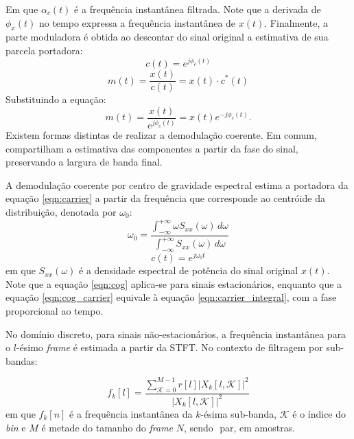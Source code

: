 Em que $\alpha_c(t)$ é a frequência instantânea filtrada. Note que a derivada de
$\phi_x(t)$ no tempo expressa a frequência instantânea de $x(t)$. Finalmente, a
parte moduladora é obtida ao descontar do sinal original a estimativa de sua
parcela portadora:
\begin{equation} \label{eqn:carrier}
    c(t) = e^{j\phi_c(t)}
\end{equation}
\begin{equation}
    m(t) = \frac{x(t)}{c(t)} = x(t) \cdot  c^*(t)
\end{equation}
Substituindo a equação:
\begin{equation}\label{eqn:demod_coh}
    m(t) = \frac{x(t)}{e^{j\phi_c(t)}} = x(t)e^{-j\phi_c(t)}.
\end{equation}
Existem formas distintas de realizar a demodulação coerente. Em comum,
compartilham a estimativa das componentes a partir da fase do sinal, preservando
a largura de banda final.

A demodulação coerente por centro de gravidade espectral \cite{clark2009time}
\cite{clark2009sum} \cite{toolbox2010} estima a portadora da equação
\ref{eqn:carrier} a partir da frequência que corresponde ao centróide da
distribuição, denotada por $\omega_0$:
\begin{equation} \label{eqn:cog}
    \omega_0 = \frac{\int_{-\infty}^{+\infty}\omega S_{xx}(\omega)\,d\omega}{\int_{-\infty}^{+\infty}S_{xx}(\omega)\,d\omega} 
\end{equation}
\begin{equation} \label{eqn:cog_carrier}
    c(t) = e^{j\omega_0 t}
\end{equation}
em que $S_{xx}(\omega)$ é a densidade espectral de potência do sinal original
$x(t)$. Note que a equação \ref{eqn:cog} aplica-se para sinais estacionários,
enquanto que a equação \ref{eqn:cog_carrier} equivale à equação
\ref{eqn:carrier_integral}, com a fase proporcional ao tempo.
% 

No domínio discreto, para sinais não-estacionários, a frequência instantânea
para o $l$-ésimo \textit{frame} é estimada a partir da STFT. No contexto de
filtragem por sub-bandas:

\begin{equation}
    f_k[l] = \frac{\sum_{\mathcal{K}=0}^{M-1} r[l] |X_k[l,\mathcal{K}]|^2}{|X_k[l,\mathcal{K}]|^2}
\end{equation}
em que $f_k[n]$ é a frequência instantânea da $k$-ésima sub-banda, $\mathcal{K}$
é o índice do \textit{bin} e $M$ é metade do tamanho do \textit{frame} $N$, sendo
$   $ par, em amostras.

